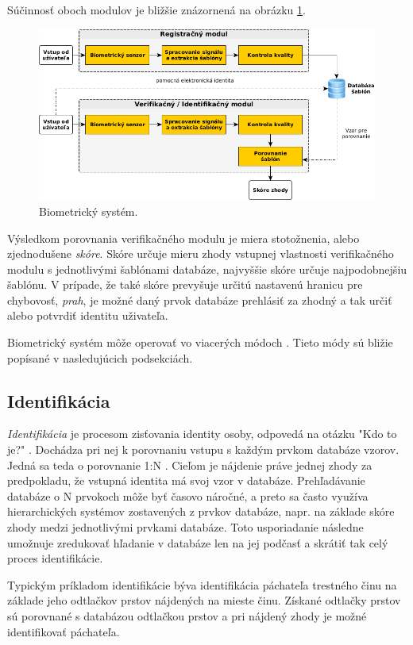 Súčinnosť oboch modulov je bližšie znázornená na obrázku \ref{fig:biosys}.

\begin{figure}[h]
	\centering
	\includegraphics[width=13cm]{img/Bio_system.png}
	\caption{Biometrický systém\cite{bio3}.}
	\label{fig:biosys}
\end{figure}

Výsledkom porovnania verifikačného modulu je miera stotožnenia, alebo zjednodušene \emph{skóre}. Skóre určuje mieru zhody vstupnej vlastnosti verifikačného modulu s jednotlivými šablónami databáze, najvyššie skóre určuje najpodobnejšiu šablónu. V prípade, že také skóre prevyšuje určitú nastavenú hranicu pre chybovosť, \emph{prah}, je možné daný prvok databáze prehlásiť za zhodný a tak určiť alebo potvrdiť identitu uživateľa. 

Biometrický systém môže operovať vo viacerých módoch \cite{bio4}. Tieto módy sú bližie popísané v nasledujúcich podsekciách.

\subsection{Identifikácia}
\emph{Identifikácia} je procesom zisťovania identity osoby, odpovedá na otázku "Kdo to je?" \cite{bio3}. Dochádza pri nej k porovnaniu vstupu s každým prvkom databáze vzorov. Jedná sa teda o porovnanie 1:N \cite{bio}. Cieľom je nájdenie práve jednej zhody za predpokladu, že vstupná identita má svoj vzor v databáze. Prehľadávanie databáze o N prvokoch môže byť časovo náročné, a preto sa často využíva hierarchických systémov zostavených z prvkov databáze, napr. na základe skóre zhody medzi jednotlivými prvkami databáze. Toto usporiadanie následne umožnuje zredukovať hľadanie v databáze len na jej podčasť a skrátiť tak celý proces identifikácie.

Typickým príkladom identifikácie býva identifikácia páchateľa trestného činu na základe jeho odtlačkov prstov nájdených na mieste činu. Získané odtlačky prstov sú porovnané s databázou odtlačkou prstov a pri nájdený zhody je možné identifikovať páchateľa.

